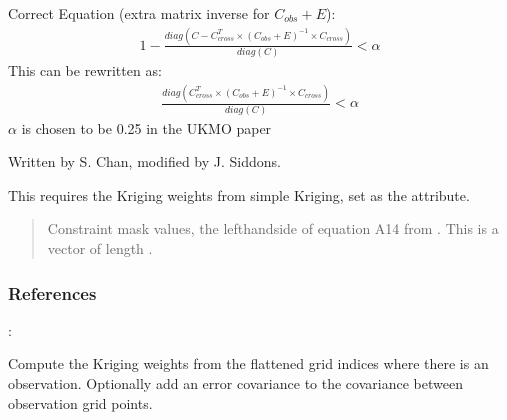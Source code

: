 \documentclass[letterpaper,10pt,english]{sphinxmanual}
\begin{document}
\begin{fulllineitems}
\begin{fulllineitems}
\sphinxAtStartPar
Correct Equation (extra matrix inverse for \(C_{obs} + E\)):
\begin{equation*}
\begin{split}1 - \frac{
    diag(C - C_{cross}^T \times (C_{obs} + E)^{-1}
             \times C_{cross})
}{diag(C)} < \alpha\end{split}
\end{equation*}
\sphinxAtStartPar
This can be re\sphinxhyphen{}written as:
\begin{equation*}
\begin{split}\frac{diag(C_{cross}^T \times (C_{obs} + E)^{-1} \times C_{cross})}
{diag(C)} < \alpha\end{split}
\end{equation*}
\sphinxAtStartPar
\(\alpha\) is chosen to be 0.25 in the UKMO paper

\sphinxAtStartPar
Written by S. Chan, modified by J. Siddons.

\sphinxAtStartPar
This requires the Kriging weights from simple Kriging, set as the
 attribute.
\begin{quote}\begin{description}
\sphinxAtStartPar
{} \textendash{} Constraint mask values, the left\sphinxhyphen{}hand\sphinxhyphen{}side of equation A14 from
. This is a vector of length .

\sphinxAtStartPar
{}

\end{description}\end{quote}
\subsubsection*{References}

\sphinxAtStartPar
{}: 

\end{fulllineitems}


\begin{fulllineitems}
\label{\detokenize{kriging:glomar_gridding.stochastic.StochasticKriging.get_kriging_weights}}
\pysigstartsignatures
\pysiglinewithargsret
{}
{}
{}
\pysigstopsignatures
\sphinxAtStartPar
Compute the Kriging weights from the flattened grid indices where
there is an observation. Optionally add an error covariance to the
covariance between observation grid points.


\end{fulllineitems}
\end{fulllineitems}
\end{document}
